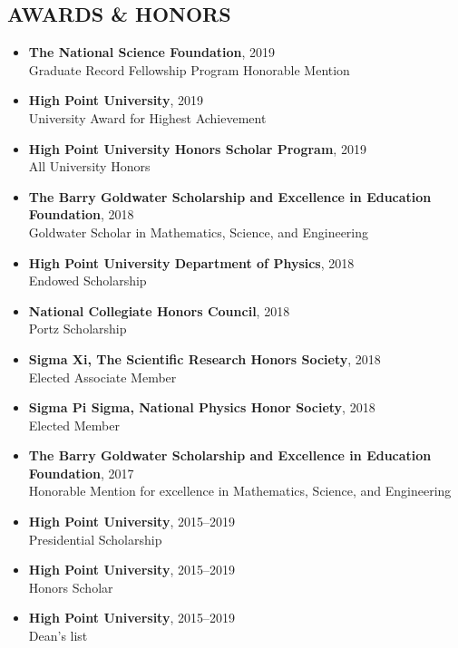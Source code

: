 \documentclass[margin, 10pt]{res} %
\begin{document}
\begin{resume}
 


\section{AWARDS \& HONORS}
\begin{itemize}
    \item \textbf{{\scriptsize The National Science Foundation}}, {\small 2019}\\Graduate Record Fellowship Program Honorable Mention
    \item \textbf{{\scriptsize High Point University}},
    {\small 2019}\\University Award for Highest Achievement
    \item \textbf{{\scriptsize High Point University Honors Scholar Program}},
    {\small 2019}\\All University Honors
	\item \textbf{{\scriptsize The Barry Goldwater Scholarship and Excellence in Education Foundation}}, {\small 2018}\\Goldwater Scholar in Mathematics, Science, and Engineering 
    \item \textbf{{\scriptsize High Point University Department of Physics}}, {\small 2018}\\Endowed Scholarship
    \item {\scriptsize \textbf{National Collegiate Honors Council}}, {\small 2018}\\Portz Scholarship
    \item \textbf{{\scriptsize Sigma Xi, The Scientific Research Honors Society}}, {\small 2018}\\Elected Associate Member
     \item \textbf{{\scriptsize Sigma Pi Sigma, National Physics Honor Society}}, {\small 2018}\\Elected Member
    \item \textbf{{\scriptsize The Barry Goldwater Scholarship and Excellence in Education Foundation}}, {\small 2017}\\Honorable Mention for excellence in Mathematics, Science, and Engineering 
	\item \textbf{{\scriptsize High Point University}}, {\small 2015--2019}\\Presidential Scholarship
    \item \textbf{{\scriptsize High Point University}}, {\small 2015--2019}\\Honors Scholar
    \item \textbf{{\scriptsize High Point University}}, {\small 2015--2019}\\Dean's list
\end{itemize}


\end{resume}
\end{document}
